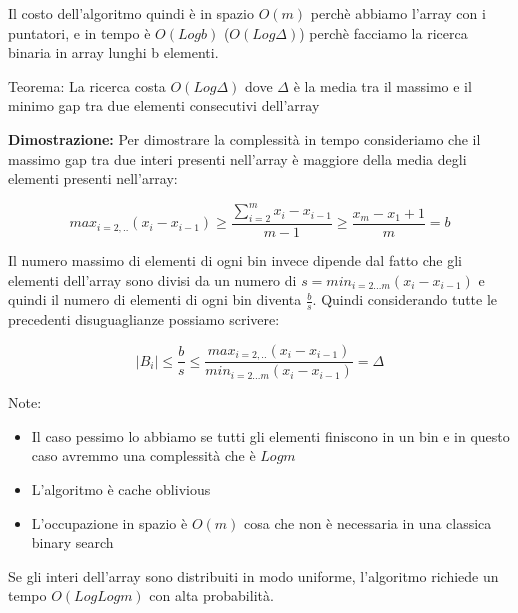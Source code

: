 \documentclass[14pt]{extreport}
\begin{document}
Il costo dell'algoritmo quindi è in spazio $O(m)$ perchè abbiamo l'array con i puntatori, e in tempo è $O(Log b)$ ($O(Log \Delta)$) perchè facciamo la ricerca binaria in array lunghi b elementi.

Teorema: La ricerca costa $O(Log \Delta)$ dove $\Delta$ è la media tra il massimo e il minimo gap tra due elementi consecutivi dell'array

\textbf{Dimostrazione:} Per dimostrare la complessità in tempo consideriamo che il massimo gap tra due interi presenti nell'array è maggiore della media degli elementi presenti nell'array:

\begin{equation}
    max_{i=2,..}(x_i-x_{i-1}) \geq \frac{\sum_{i=2}^m x_i - x_{i-1}}{m-1} \geq \frac{x_m - x_1 + 1}{m} = b
\end{equation}

Il numero massimo di elementi di ogni bin invece dipende dal fatto che gli elementi dell'array sono divisi da un numero di $s= min_{i=2...m}(x_i-x_{i-1})$ e quindi il numero di elementi di ogni bin diventa $\frac{b}{s}$.
Quindi considerando tutte le precedenti disuguaglianze possiamo scrivere:

\begin{equation}
    |B_i| \leq \frac{b}{s} \leq \frac{max_{i=2,..}(x_i-x_{i-1}) }{min_{i=2...m}(x_i-x_{i-1})} = \Delta 
\end{equation}

Note:
\begin{itemize}
\item Il caso pessimo lo abbiamo se tutti gli elementi finiscono in un bin e in questo caso avremmo una complessità che è $Log m$
\item L'algoritmo è cache oblivious
\item L'occupazione in spazio è $O(m)$ cosa che non è necessaria in una classica binary search

\end{itemize}

Se gli interi dell'array sono distribuiti in modo uniforme, l'algoritmo richiede un tempo $O(Log Log m)$ con alta probabilità.
\end{document}
